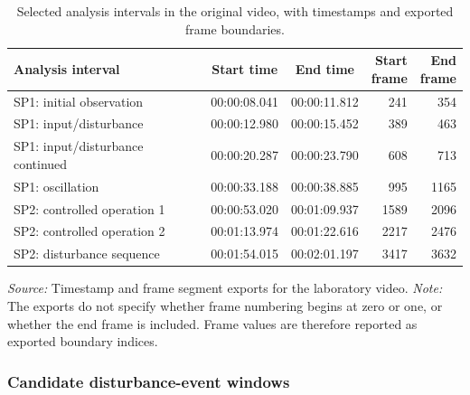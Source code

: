 \documentclass{article}
\begin{document}
\begin{table}[htbp]
    \centering
    \small
    \caption{Selected analysis intervals in the original video,
    with timestamps and exported frame boundaries.}
    \label{tab:intervals}
    \begin{tabular}{@{}lccrr@{}}
        \toprule
        Analysis interval
        & Start time
        & End time
        & \shortstack{Start\\frame}
        & \shortstack{End\\frame} \\
        \midrule
        SP1: initial observation
        & 00:00:08.041 & 00:00:11.812 & 241 & 354 \\

        SP1: input/disturbance
        & 00:00:12.980 & 00:00:15.452 & 389 & 463 \\

        SP1: input/disturbance continued
        & 00:00:20.287 & 00:00:23.790 & 608 & 713 \\

        SP1: oscillation
        & 00:00:33.188 & 00:00:38.885 & 995 & 1165 \\

        SP2: controlled operation 1
        & 00:00:53.020 & 00:01:09.937 & 1589 & 2096 \\

        SP2: controlled operation 2
        & 00:01:13.974 & 00:01:22.616 & 2217 & 2476 \\

        SP2: disturbance sequence
        & 00:01:54.015 & 00:02:01.197 & 3417 & 3632 \\
        \bottomrule
    \end{tabular}

    \smallskip
    \begin{minipage}{\linewidth}
        \footnotesize
        \textit{Source:} Timestamp and frame segment exports
        for the laboratory video.
        \textit{Note:} The exports do not specify whether
        frame numbering begins at zero or one, or whether
        the end frame is included. Frame values are therefore
        reported as exported boundary indices.
    \end{minipage}
\end{table}

\subsubsection{Candidate disturbance-event windows}
\label{sec:disturbance-windows}
\end{document}
